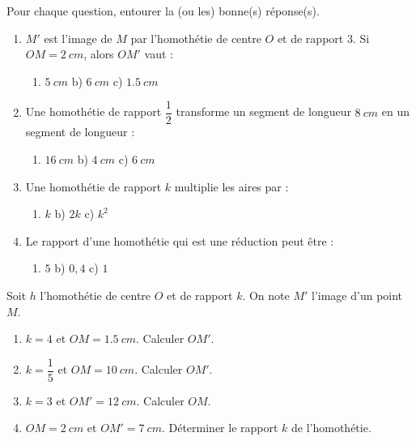 \documentclass[11pt]{article}
\begin{document}
\begin{exercice}[QCM]
Pour chaque question, entourer la (ou les) bonne(s) réponse(s).
\begin{enumerate}
  \item $M'$ est l'image de $M$ par l'homothétie de centre $O$ et de rapport $3$. Si $OM = \SI{2}{cm}$, alors $OM'$ vaut :
  \begin{enumerate}
    \item[a)] $\SI{5}{cm}$ \quad b) $\SI{6}{cm}$ \quad c) $\SI{1,5}{cm}$
  \end{enumerate}
  \item Une homothétie de rapport $\dfrac{1}{2}$ transforme un segment de longueur $\SI{8}{cm}$ en un segment de longueur :
  \begin{enumerate}
    \item[a)] $\SI{16}{cm}$ \quad b) $\SI{4}{cm}$ \quad c) $\SI{6}{cm}$
  \end{enumerate}
  \item Une homothétie de rapport $k$ multiplie les aires par :
  \begin{enumerate}
    \item[a)] $k$ \quad b) $2k$ \quad c) $k^2$
  \end{enumerate}
  \item Le rapport d'une homothétie qui est une réduction peut être :
  \begin{enumerate}
    \item[a)] $5$ \quad b) $0{,}4$ \quad c) $1$
  \end{enumerate}
\end{enumerate}
\end{exercice}

\begin{exercice}
Soit $h$ l'homothétie de centre $O$ et de rapport $k$. On note $M'$ l'image d'un point $M$.
\begin{enumerate}
  \item $k = 4$ et $OM = \SI{1,5}{cm}$. Calculer $OM'$.
  \item $k = \dfrac{1}{5}$ et $OM = \SI{10}{cm}$. Calculer $OM'$.
  \item $k = 3$ et $OM' = \SI{12}{cm}$. Calculer $OM$.
  \item $OM = \SI{2}{cm}$ et $OM' = \SI{7}{cm}$. Déterminer le rapport $k$ de l'homothétie.
\end{enumerate}
\end{exercice}
\end{document}
